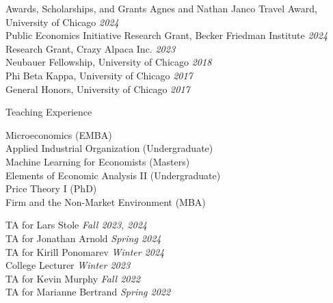 \documentclass{resume} %
\begin{document}
	\begin{rSection}{Awards, Scholarships, and Grants}
		Agnes and Nathan Janco Travel Award, University of Chicago \hfill {\em 2024} \\
		Public Economics Initiative Research Grant, Becker Friedman Institute \hfill {\em 2024} \\
		Research Grant, Crazy Alpaca Inc. \hfill {\em 2023} \\
		Neubauer Fellowship, University of Chicago \hfill {\em 2018} \\
		Phi Beta Kappa, University of Chicago \hfill {\em 2017} \\
		General Honors, University of Chicago \hfill {\em 2017}
	\end{rSection}

	\begin{rSection}{Teaching Experience}
		\begin{minipage}[t]{0.54\textwidth}
			Microeconomics (EMBA) \\
			Applied Industrial Organization (Undergraduate) \\
			Machine Learning for Economists (Masters) \\
			Elements of Economic Analysis II (Undergraduate) \\
			Price Theory I (PhD) \\
			Firm and the Non-Market Environment (MBA)
		\end{minipage}
		\begin{minipage}[t]{0.42\textwidth}
			TA for Lars Stole \hfill {\em Fall 2023, 2024} \\
			TA for Jonathan Arnold \hfill {\em Spring 2024} \\
			TA for Kirill Ponomarev \hfill {\em Winter 2024} \\
			College Lecturer \hfill {\em Winter 2023} \\
			TA for Kevin Murphy \hfill {\em Fall 2022} \\
			TA for Marianne Bertrand \hfill {\em Spring 2022}
		\end{minipage}
	\end{rSection}
\end{document}
